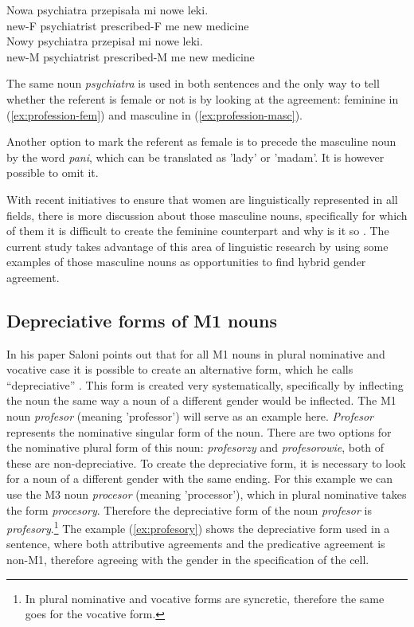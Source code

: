 \begin{exe}
  \ex\label{ex:profession-fem}
  \gll Nowa psychiatra przepisała mi nowe leki.\\
  new-F psychiatrist prescribed-F me new medicine\\

  \ex\label{ex:profession-masc}
  \gll Nowy psychiatra przepisał mi nowe leki.\\
  new-M psychiatrist prescribed-M me new medicine\\
\end{exe}

The same noun \textsl{psychiatra} is used in both sentences and the only way to tell whether the referent is female or not is by looking at the agreement: feminine in (\ref{ex:profession-fem}) and masculine in (\ref{ex:profession-masc}).

Another option to mark the referent as female is to precede the masculine noun by the word \textsl{pani}, which can be translated as 'lady' or 'madam'. It is however possible to omit it.

With recent initiatives to ensure that women are linguistically represented in all fields, there is more discussion about those masculine nouns, specifically for which of them it is difficult to create the feminine counterpart and why is it so \citep{szpyra-kozlowska_premiera_2019, szpyra-kozlowska_czy_2022}. The current study takes advantage of this area of linguistic research by using some examples of those masculine nouns as opportunities to find hybrid gender agreement.

\subsection{Depreciative forms of M1 nouns}
In his paper Saloni points out that for all M1 nouns in plural nominative and vocative case it is possible to create an alternative form, which he calls ``depreciative'' \citep{saloni_o_1988}. This form is created very systematically, specifically by inflecting the noun the same way a noun of a different gender would be inflected. The M1 noun \textsl{profesor} (meaning 'professor') will serve as an example here. \textsl{Profesor} represents the nominative singular form of the noun. There are two options for the nominative plural form of this noun: \textsl{profesorzy} and \textsl{profesorowie}, both of these are non-depreciative. To create the depreciative form, it is necessary to look for a noun of a different gender with the same ending. For this example we can use the M3 noun \textsl{procesor} (meaning 'processor'), which in plural nominative takes the form \textsl{procesory}. Therefore the depreciative form of the noun \textsl{profesor} is \textsl{profesory}.\footnote{In plural nominative and vocative forms are syncretic, therefore the same goes for the vocative form.} The example (\ref{ex:profesory}) shows the depreciative form used in a sentence, where both attributive agreements and the predicative agreement is non-M1, therefore agreeing with the gender in the specification of the cell.

